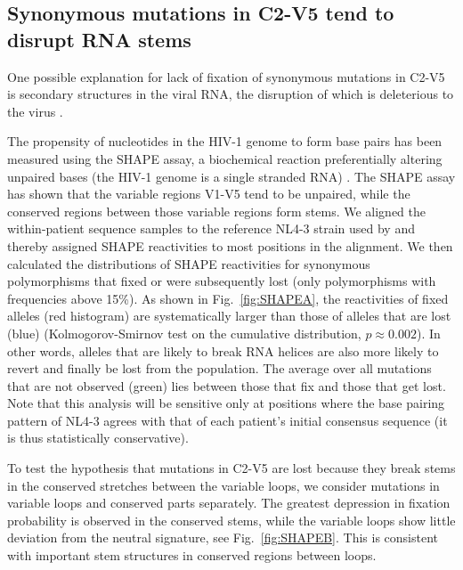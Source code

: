 \documentclass[rmp, twocolumn]{revtex4}
\newcommand{\FIG}[1]{Fig.~\ref{fig:#1}}
\newcommand{\shankaregion}{C2-V5}
\begin{document}
\subsection{Synonymous mutations in \shankaregion{} tend to disrupt RNA stems}
One possible explanation for lack of fixation of synonymous mutations in
\shankaregion{} is secondary structures in the viral RNA, the disruption of which
is deleterious to the virus \citep{forsdyke_reciprocal_1995,
snoeck_mapping_2011, sanjuan_interplay_2011}.

The propensity of nucleotides in the HIV-1 genome to form base pairs has been
measured using the SHAPE assay, a biochemical reaction preferentially altering
unpaired bases (the HIV-1 genome is a single stranded RNA)
\citep{watts_architecture_2009}. The SHAPE assay has shown that the variable
regions V1-V5 tend to be unpaired, while the conserved regions between those
variable regions form stems.  We aligned the within-patient sequence samples 
to the reference NL4-3 strain used by \citet{watts_architecture_2009} and 
thereby assigned SHAPE reactivities to most positions in the alignment. 
We then calculated the distributions of SHAPE reactivities for synonymous 
polymorphisms that fixed or were subsequently lost (only polymorphisms with 
frequencies above 15\%).
As shown in \FIG{SHAPEA}, the reactivities of fixed alleles (red
histogram) are systematically larger than those of alleles that are lost (blue)
(Kolmogorov-Smirnov test on the cumulative distribution, $p\approx 0.002$). In
other words, alleles that are likely to break RNA helices are also more likely
to revert and finally be lost from the population. The average over all
mutations that are not observed (green) lies between  those that fix and
those that get lost. Note that this analysis will be sensitive only at positions
where the base pairing pattern of NL4-3 agrees with that of each patient's
initial consensus sequence (it is thus statistically conservative).

To test the hypothesis that mutations in \shankaregion{} are lost because they
break stems in the conserved stretches between the variable loops, we consider
mutations in variable loops and conserved parts separately. The greatest
depression in fixation probability is observed in the conserved stems, while the
variable loops show little deviation from the neutral signature, see
\FIG{SHAPEB}. This is consistent with important stem structures in conserved
regions between loops.
\end{document}
